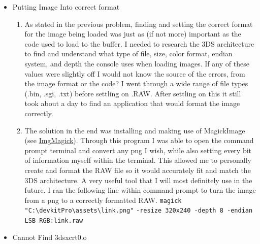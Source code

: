 \documentclass{article}
\begin{document}
\begin{itemize}
\begin{enumerate}
        \item In the end I never was able to fix it 100 percent. The image of Link loads but it is compressed and rotated 90 degrees counterclockwise. I ruled out a problem with the colors through the RGBtoRGB565 function, and removed the offset so it would just print in the top left corner. After this the solution was simply to try numerous different for-loop iterations, and find the one that worked best. In the end I was left with the double for-loop (see \hyperref[forloop]{Code Explanations}). I believe the function to also be a bit specific to this image, as others do not load correctly. In the future, I would really like to sort this out, I believe with more time it is within my ability to do so.  
    \end{enumerate}
\item \label{micro4} Putting Image Into correct format
    \begin{enumerate}
        \item As stated in the previous problem, finding and setting the correct format for the image being loaded was just as (if not more) important as the code used to load to the buffer. I needed to research the 3DS architecture to find and understand what type of file, size, color format, endian system, and depth the console uses when loading images. If any of these values were slightly off I would not know the source of the errors, from the image format or the code? I went through a wide range of file types (.bin, .sgi, .txt) before settling on .RAW. After settling on this it still took about a day to find an application that would format the image correctly. 
        \item The solution in the end was installing and making use of MagickImage (see \hyperref[immag]{ImgMagick}). Through this program I was able to open the command prompt terminal and convert any png I wish, while also setting every bit of information myself within the terminal. This allowed me to personally create and format the RAW file so it would accurately fit and match the 3DS architecture. A very useful tool that I will most definitely use in the future. I ran the following line within command prompt to turn the image from a png to a correctly formatted RAW. \newline 
        \verb|magick "C:\devkitPro\assets\link.png"|\newline
        \verb|-resize 320x240 -depth 8 -endian LSB RGB:link.raw|
    \end{enumerate}
\item \label{micro5} Cannot Find 3dsxcrt0.o

\end{itemize}
\end{document}
